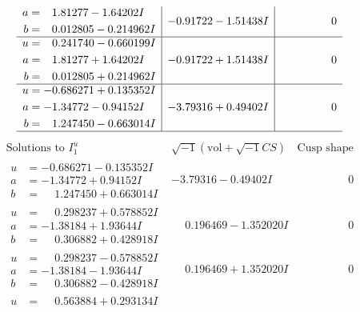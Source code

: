 \documentclass[1p]{elsarticle_modified}
\theoremstyle{definition}
\newcommand{\I}{\sqrt{-1}}
\begin{document}
$$\begin{array}{c|c|c}
\begin{aligned}
a &= \phantom{-}1.81277 - 1.64202 I \\
b &= \phantom{-}0.012805 - 0.214962 I\end{aligned}
 & -0.91722 - 1.51438 I & \phantom{-0.000000 } 0 \\ \hline\begin{aligned}
u &= \phantom{-}0.241740 - 0.660199 I \\
a &= \phantom{-}1.81277 + 1.64202 I \\
b &= \phantom{-}0.012805 + 0.214962 I\end{aligned}
 & -0.91722 + 1.51438 I & \phantom{-0.000000 } 0 \\ \hline\begin{aligned}
u &= -0.686271 + 0.135352 I \\
a &= -1.34772 - 0.94152 I \\
b &= \phantom{-}1.247450 - 0.663014 I\end{aligned}
 & -3.79316 + 0.49402 I & \phantom{-0.000000 } 0\\
 \hline 
 \end{array}$$\newpage$$\begin{array}{c|c|c}  
\text{Solutions to }I^u_{1}& \I (\text{vol} + \sqrt{-1}CS) & \text{Cusp shape}\\
 \hline 
\begin{aligned}
u &= -0.686271 - 0.135352 I \\
a &= -1.34772 + 0.94152 I \\
b &= \phantom{-}1.247450 + 0.663014 I\end{aligned}
 & -3.79316 - 0.49402 I & \phantom{-0.000000 } 0 \\ \hline\begin{aligned}
u &= \phantom{-}0.298237 + 0.578852 I \\
a &= -1.38184 + 1.93644 I \\
b &= \phantom{-}0.306882 + 0.428918 I\end{aligned}
 & \phantom{-}0.196469 - 1.352020 I & \phantom{-0.000000 } 0 \\ \hline\begin{aligned}
u &= \phantom{-}0.298237 - 0.578852 I \\
a &= -1.38184 - 1.93644 I \\
b &= \phantom{-}0.306882 - 0.428918 I\end{aligned}
 & \phantom{-}0.196469 + 1.352020 I & \phantom{-0.000000 } 0 \\ \hline\begin{aligned}
u &= \phantom{-}0.563884 + 0.293134 I \\

\end{aligned}
\end{array}$$
\end{document}
